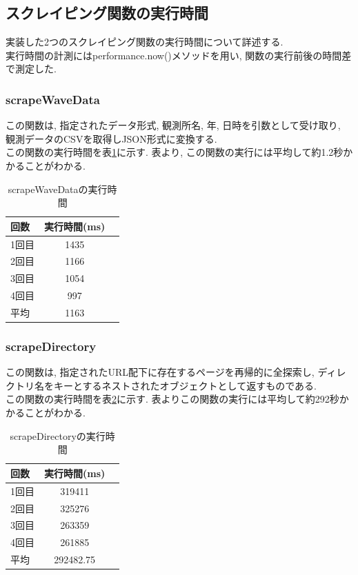 \subsection{スクレイピング関数の実行時間}
実装した2つのスクレイピング関数の実行時間について詳述する. \\
実行時間の計測にはperformance.now()メソッドを用い, 関数の実行前後の時間差で測定した. 

\newpage

\subsubsection{scrapeWaveData}
この関数は, 指定されたデータ形式, 観測所名, 年, 日時を引数として受け取り, 観測データのCSVを取得しJSON形式に変換する. \\
この関数の実行時間を表\ref{table:scrapeWaveData}に示す. 
表より, この関数の実行には平均して約1.2秒かかることがわかる. 

\begin{table}[hbtp]
	\caption{scrapeWaveDataの実行時間}
	\label{table:scrapeWaveData}
	\centering
	\begin{tabular}{lcr}
		\hline
		回数  & 実行時間(ms) \\
		\hline \hline
		1回目 & 1435     \\
		2回目 & 1166     \\
		3回目 & 1054     \\
		4回目 & 997      \\
		\hline
		平均  & 1163
	\end{tabular}
\end{table}

\subsubsection{scrapeDirectory}
この関数は, 指定されたURL配下に存在するページを再帰的に全探索し, ディレクトリ名をキーとするネストされたオブジェクトとして返すものである. \\
この関数の実行時間を表\ref{table:scrapeDirectory}に示す. 
表よりこの関数の実行には平均して約292秒かかることがわかる. 

\begin{table}[hbtp]
	\caption{scrapeDirectoryの実行時間}
	\label{table:scrapeDirectory}
	\centering
	\begin{tabular}{lcr}
		\hline
		回数  & 実行時間(ms)   \\
		\hline \hline
		1回目 & 319411     \\
		2回目 & 325276     \\
		3回目 & 263359     \\
		4回目 & 261885     \\
		\hline
		平均  & 292482.75
	\end{tabular}
\end{table}


